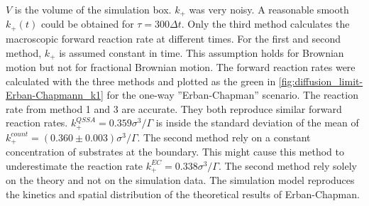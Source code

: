 \documentclass[
  a4paper,BCOR10mm,twoside,
  headsepline,footsepline,%
  fleqn,openbib
]{scrbook}
\begin{document}
$V$ is the volume of the simulation box. $k_+$ was very noisy. A reasonable smooth $k_+(t)$ could be obtained for $\tau=300 \Delta t$. Only the third method calculates the macroscopic forward reaction rate at different times. For the first and second method, $k_{+}$ is assumed constant in time. This assumption holds for Brownian motion but not for fractional Brownian motion. The forward reaction rates were calculated with the three methods and plotted  as the green in \cref{fig:diffusion_limit-Erban-Chapmann_k1} for the one-way ”Erban-Chapman” scenario. The reaction rate from method 1 and 3 are accurate. They both reproduce similar forward reaction rates. $k^{QSSA}_{+}=0.359 \sigma^3/\Gamma$ is inside the standard deviation of the mean of  $k^{count}_+=(0.360\pm0.003)\sigma^3/\Gamma$. The second method rely on a constant concentration of substrates at the boundary. This might cause this method to underestimate the reaction rate $k^{EC}_{+}=0.338 \sigma^3/\Gamma$. The second method rely solely on the theory and not on the simulation data. The simulation model reproduces the kinetics and spatial distribution of the theoretical results of Erban-Chapman.
\end{document}
